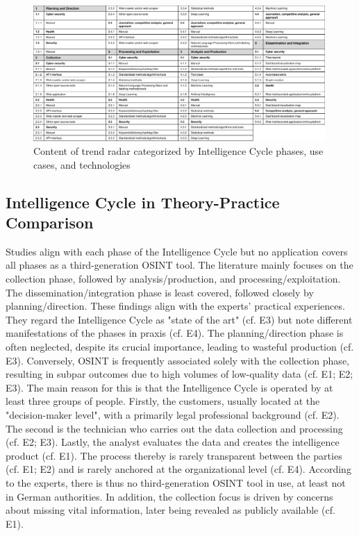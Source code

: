 \documentclass[10pt]{article}
\begin{document}
\begin{figure}[thb]
    \centering
    \includegraphics[width=0.99\textwidth]{PDF/images/crop_Trendradar explanation}
    \caption{Content of trend radar categorized by Intelligence Cycle phases, use cases, and technologies}
    \label{fig:trendradarexplanation}
\end{figure}

\subsection{Intelligence Cycle in Theory-Practice Comparison} \label{sec:intcomp}

Studies align with each phase of the Intelligence Cycle but no application covers all phases as a third-generation OSINT tool. The literature mainly focuses on the collection phase, followed by analysis/production, and processing/exploitation. The dissemination/integration phase is least covered, followed closely by planning/direction.
These findings align with the experts' practical experiences. They regard the Intelligence Cycle as "state of the art" (cf. E3) but note different manifestations of the phases in praxis (cf. E4).
The planning/direction phase is often neglected, despite its crucial importance, leading to wasteful production (cf. E3). Conversely, OSINT is frequently associated solely with the collection phase,
resulting in subpar outcomes due to high volumes of low-quality data (cf. E1; E2; E3). The main reason for this is that the Intelligence Cycle is operated by at least three groups of people. Firstly, the customers, usually located at the "decision-maker level", with a primarily legal professional background (cf. E2).
The second is the technician who carries out the data collection and processing (cf. E2; E3). Lastly, the analyst evaluates the data and creates the intelligence product (cf. E1). The process thereby is rarely transparent between the parties
(cf. E1; E2) and is rarely anchored at the organizational level (cf. E4). According to the experts, there is thus no third-generation
OSINT tool in use, at least not in German authorities. In addition, the collection focus is driven by concerns about missing vital information, later being revealed as publicly available (cf. E1).
\end{document}
